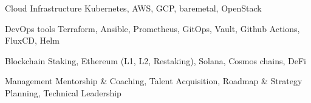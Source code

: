   \cvskill
    {Cloud Infrastructure}
    {Kubernetes, AWS, GCP, baremetal, OpenStack}

  \cvskill
    {DevOps tools}
    {Terraform, Ansible, Prometheus, GitOps, Vault, Github Actions, FluxCD, Helm}

  \cvskill
    {Blockchain}
    {Staking, Ethereum (L1, L2, Restaking), Solana, Cosmos chains, DeFi}

  \cvskill
    {Management}
    {Mentorship \& Coaching, Talent Acquisition, Roadmap \& Strategy Planning, Technical Leadership}

